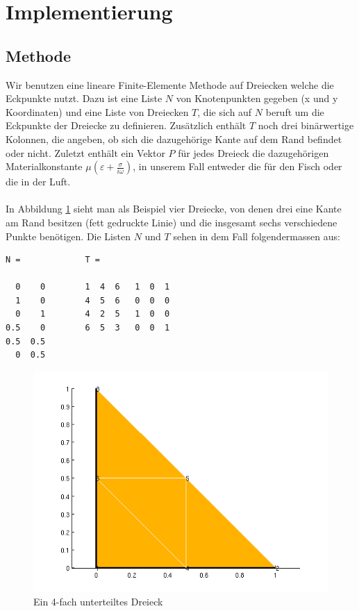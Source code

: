 \documentclass[ngerman,11pt,a4paper,titlepage]{article}
\begin{document}
\section{Implementierung}
\subsection{Methode}
Wir benutzen eine lineare Finite-Elemente Methode auf Dreiecken welche die Eckpunkte nutzt. Dazu ist eine Liste $N$ von Knotenpunkten gegeben (x und y Koordinaten) und eine Liste von Dreiecken $T$, die sich auf $N$ beruft um die Eckpunkte der Dreiecke zu definieren. Zusätzlich enthält $T$ noch drei binärwertige Kolonnen, die angeben, ob sich die dazugehörige Kante auf dem Rand befindet oder nicht. Zuletzt enthält ein Vektor $P$ für jedes Dreieck die dazugehörigen Materialkonstante $\mu(\varepsilon + \frac{\sigma}{i\omega})$, in unserem Fall entweder die für den Fisch oder die in der Luft.

\paragraph{}In Abbildung \ref{drei} sieht man als Beispiel vier Dreiecke, von denen drei eine Kante am Rand besitzen (fett gedruckte Linie) und die insgesamt sechs verschiedene Punkte benötigen. Die Listen $N$ und $T$ sehen in dem Fall folgendermassen aus:

\begin{lstlisting}
N =             T =

  0    0        1  4  6   1  0  1
  1    0        4  5  6   0  0  0
  0    1        4  2  5   1  0  0
0.5    0        6  5  3   0  0  1
0.5  0.5
  0  0.5
\end{lstlisting}

\begin{figure}[h]
  \begin{center}
    \includegraphics[scale=0.75]{pics/dreieck.png}
  \end{center}
  \caption{Ein 4-fach unterteiltes Dreieck}
  \label{drei}
\end{figure}
\end{document}
